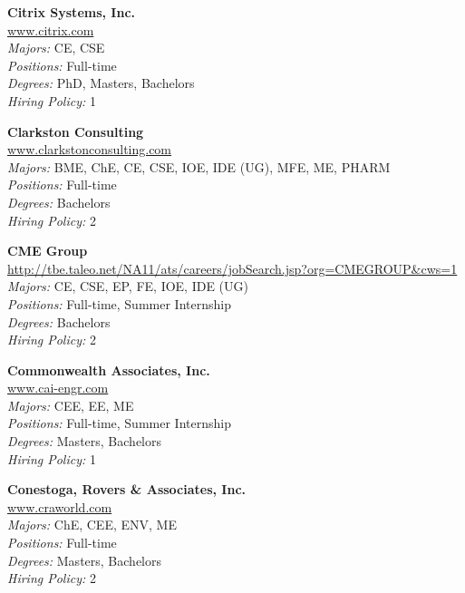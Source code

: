 \documentclass[twoside]{article}
\begin{document}
\begin{center}
\begin{multicols}{3}
\begin{minipage}{.9\columnwidth}{\Large\bf Citrix Systems, Inc. }\\
	\url{www.citrix.com}\\
	\emph{Majors:} CE, CSE\\
	\emph{Positions:} Full-time\\
	\emph{Degrees:} PhD, Masters, Bachelors\\
	\emph{Hiring Policy:} 1\\
\end{minipage}
 
\begin{minipage}{.9\columnwidth}{\Large\bf Clarkston Consulting }\\
	\url{www.clarkstonconsulting.com}\\
	\emph{Majors:} BME, ChE, CE, CSE, IOE, IDE (UG), MFE, ME, PHARM\\
	\emph{Positions:} Full-time\\
	\emph{Degrees:} Bachelors\\
	\emph{Hiring Policy:} 2\\
\end{minipage}
 
\begin{minipage}{.9\columnwidth}{\Large\bf CME Group }\\
	\url{http://tbe.taleo.net/NA11/ats/careers/jobSearch.jsp?org=CMEGROUP&cws=1}\\
	\emph{Majors:} CE, CSE, EP, FE, IOE, IDE (UG)\\
	\emph{Positions:} Full-time, Summer Internship\\
	\emph{Degrees:} Bachelors\\
	\emph{Hiring Policy:} 2\\
\end{minipage}
 
\begin{minipage}{.9\columnwidth}{\Large\bf Commonwealth Associates, Inc. }\\
	\url{www.cai-engr.com}\\
	\emph{Majors:} CEE, EE, ME\\
	\emph{Positions:} Full-time, Summer Internship\\
	\emph{Degrees:} Masters, Bachelors\\
	\emph{Hiring Policy:} 1\\
\end{minipage}
 
\begin{minipage}{.9\columnwidth}{\Large\bf Conestoga, Rovers \& Associates, Inc. }\\
	\url{www.craworld.com}\\
	\emph{Majors:} ChE, CEE, ENV, ME\\
	\emph{Positions:} Full-time\\
	\emph{Degrees:} Masters, Bachelors\\
	\emph{Hiring Policy:} 2\\
\end{minipage}
 

\end{multicols}
\end{center}
\end{document}
